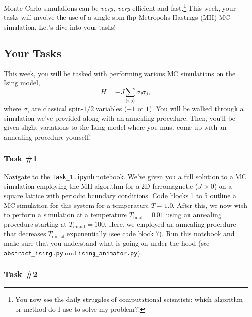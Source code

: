\documentclass[12pt]{article}
\begin{document}
Monte Carlo simulations can be {\it very, very} efficient and fast.\footnote{You now see the daily struggles of computational scientists: which algorithm or method do I use to solve my problem?!} This week, your tasks will involve the use of a single-spin-flip Metropolis-Hastings (MH) MC simulation. Let's dive into your tasks!

\subsection*{Your Tasks}

This week, you will be tasked with performing various MC simulations on the Ising model,
\begin{equation}
    H = -J\sum_{\langle i,j \rangle} \sigma_i \sigma_j,
\end{equation}
where $\sigma_i$ are classical spin-$1/2$ variables ($-1$ or $1$). You will be walked through a simulation we've provided along with an annealing procedure. Then, you'll be given slight variations to the Ising model where you must come up with an annealing procedure yourself!

\subsubsection*{Task \#1}

Navigate to the \texttt{Task\_1.ipynb} notebook. We've given you a full solution to a MC simulation employing the MH algorithm for a 2D ferromagnetic ($J > 0$) on a square lattice with periodic boundary conditions. Code blocks 1 to 5 outline a MC simulation for this system for a temperature $T = 1.0$. After this, we now wish to perform a simulation at a temperature $T_{\text{final}} = 0.01$ using an annealing procedure starting at $T_{\text{initial}} = 100$. Here, we employed an annealing procedure that decreases $T_{\text{initial}}$ exponentially (see code block 7). Run this notebook and make sure that you understand what is going on under the hood (see \texttt{abstract\_ising.py} and \texttt{ising\_animator.py}).  

\subsubsection*{Task \#2}
\end{document}
